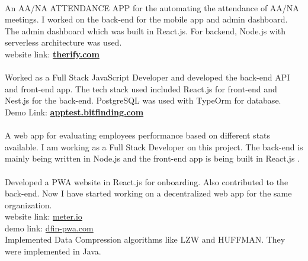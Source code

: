 \documentclass[draft=false]{deedy-resume-openfont}
\begin{document}
\begin{minipage}[t]{0.58\textwidth}
\\An AA/NA ATTENDANCE APP for the automating the attendance of AA/NA meetings. I worked on the back-end for the mobile app and admin dashboard. The admin dashboard which was built in React.js. For backend, Node.js with serverless architecture was used. \\
\vspace{0.2cm}
website link: \href{http://therify.com/}{\bf therify.com} \\
\vspace{0.2cm}
\\ Worked as a Full Stack JavaScript Developer and developed the back-end API and front-end app. The tech stack used included React.js for front-end and Nest.js for the back-end. PostgreSQL was used with TypeOrm for database.\\
Demo Link: \href{https://apptest.bitfinding.com}{\bf apptest.bitfinding.com}\\
\vspace{0.2cm}
\\ A web app for evaluating employees performance based on different stats available. I am working as a Full Stack Developer on this project. The back-end is mainly being written in Node.js and the front-end app is being built in React.js .\\
\vspace{0.2cm}
\\ Developed a PWA website in React.js for onboarding. Also contributed to the back-end. Now I have started working on a decentralized web app for the same organization. \\
website link: \href{https://www.meter.io/}{meter.io}\\
demo link: \href{http://dfinlab.s3-website-us-east-1.amazonaws.com/registration}{dfin-pwa.com}\\
\vspace{0.2cm}
 Implemented Data Compression algorithms like LZW and HUFFMAN. They were implemented in Java.
\sectionsep

\end{minipage} 
\end{document}
